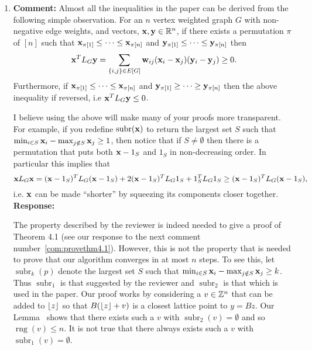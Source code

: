 \documentclass[a4paper,10pt]{article}
\begin{document}
\begin{enumerate}
\newcommand{\rng}{\operatorname{rng}}
\newcommand{\subrng}{\operatorname{subr}}
\newcommand{\decrng}{\operatorname{decrng}}

\item\textbf{Comment:} \label{com:uselaplaicesubr1}
Almost all the inequalities in the paper can be derived from the following simple observation.  For an $n$ vertex weighted graph $G$ with non-negative edge weights, and vectors, $\mathbf{x},\mathbf{y} \in {\mathbb R}^n$, if there exists a permutation $\pi$ of $[n]$ such that $\mathbf{x}_{\pi[1]} \leq \dots \leq \mathbf{x}_{\pi[n]}$ and $\mathbf{y}_{\pi[1]} \leq \dots \leq \mathbf{y}_{\pi[n]}$ then
\[
\mathbf{x}^T L_G \mathbf{y} = \sum_{ \{i,j\} \in E[G] } \mathbf{w}_{ij} (\mathbf{x}_{i} - \mathbf{x}_{j}) (\mathbf{y}_{i} - \mathbf{y}_{j}) \geq 0.
\]
Furthermore, if $\mathbf{x}_{\pi[1]} \leq \dots \leq \mathbf{x}_{\pi[n]}$ and $\mathbf{y}_{\pi[1]} \geq \dots \geq \mathbf{y}_{\pi[n]}$ then the above inequality if reversed, i.e $\mathbf{x}^T L_G \mathbf{y} \leq 0$. 

I believe using the above will make many of your proofs more transparent.  For example, if you redefine $\subrng(\xbf)$ to return the largest set $S$ such that $\min_{i\in S} \mathbf{x}_i - \max_{j \notin S} \mathbf{x}_j \geq 1$, then notice that if $S \neq \emptyset$ then there is a permutation that puts both $\mathbf{x} - 1_S$ and $1_S$ in non-decreasing order. In particular this implies that
\[
\mathbf{x} L_G \mathbf{x} = (\mathbf{x} - 1_S)^T L_G (\mathbf{x} - 1_S) + 2(\mathbf{x} - 1_S)^T L_G 1_S + 1_S^T L_G 1_S \geq (\mathbf{x} - 1_S)^T L_G (\mathbf{x} - 1_S),
\]
i.e. $\mathbf{x}$ can be made ``shorter'' by squeezing its components closer together.
\\\textbf{Response:}

The property described by the reviewer is indeed needed to give a proof of Theorem 4.1 (see our response to the next comment number~\ref{com:provethm4.1}).  However, this is not the property that is needed to prove that our algorithm converges in at most $n$ steps.  To see this, let $\subrng_k(p)$ denote the largest set $S$ such that $\min_{i\in S} \mathbf{x}_i - \max_{j \notin S} \mathbf{x}_j \geq k$. Thus $\subrng_1$ is that suggested by the reviewer and $\subrng_2$ is that which is used in the paper.  Our proof works by considering a $v \in {\mathbb Z}^n$ that can be added to ${\left\lfloor z \right\rfloor}$ so that $B({\left\lfloor z \right\rfloor} + v)$ is a closest lattice point to $y = Bz$.  Our Lemma~ shows that there exists such a $v$ with $\subrng_2(v) = \emptyset$ and so $\rng(v) \leq n$.  It is not true that there always exists such a $v$ with  $\subrng_1(v) = \emptyset$.


\end{enumerate}
\end{document}
